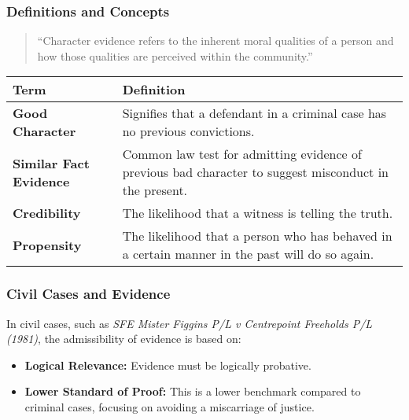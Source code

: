 \subsubsection{Definitions and
Concepts}\label{definitions-and-concepts-1}

\begin{quote}
``Character evidence refers to the inherent moral qualities of a person
and how those qualities are perceived within the community.''
\end{quote}

\begin{longtable}[]{@{}
  >{\raggedright\arraybackslash}p{}
  >{\raggedright\arraybackslash}p{}@{}}
\toprule\noalign{}
\begin{minipage}[b]{\linewidth}\raggedright
\textbf{Term}
\end{minipage} & \begin{minipage}[b]{\linewidth}\raggedright
\textbf{Definition}
\end{minipage} \\
\midrule\noalign{}
\endhead
\bottomrule\noalign{}
\endlastfoot
\textbf{Good Character} & Signifies that a defendant in a criminal case
has no previous convictions. \\
\textbf{Similar Fact Evidence} & Common law test for admitting evidence
of previous bad character to suggest misconduct in the present. \\
\textbf{Credibility} & The likelihood that a witness is telling the
truth. \\
\textbf{Propensity} & The likelihood that a person who has behaved in a
certain manner in the past will do so again. \\
\end{longtable}

\subsubsection{Civil Cases and Evidence}\label{civil-cases-and-evidence}

In civil cases, such as \emph{SFE Mister Figgins P/L v Centrepoint
Freeholds P/L (1981)}, the admissibility of evidence is based on:

\begin{itemize}
\tightlist
\item
  \textbf{Logical Relevance:} Evidence must be logically probative.
\item
  \textbf{Lower Standard of Proof:} This is a lower benchmark compared
  to criminal cases, focusing on avoiding a miscarriage of justice.
\end{itemize}

